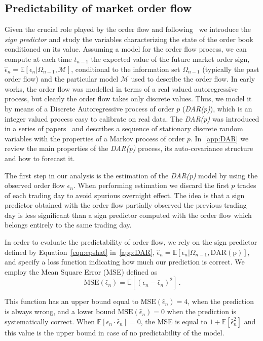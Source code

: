 \documentclass[12pt]{iopart}
\begin{document}
\subsection{Predictability of market order flow}
Given the crucial role played by the order flow and following~\cite{lillo2004long} we introduce the \textit{sign predictor} and study the variables characterizing the state of the order book conditioned on its value. Assuming a model for the order flow process, we can compute at each time $t_{n-1}$ the expected value of the future market order sign, $\hat{\epsilon}_n=\mathbb{E}[\epsilon_n|\Omega_{n-1},\mathcal{M}]$, conditional to the information set $\Omega_{n-1}$ (typically the past order flow) and the particular model $\mathcal{M}$ used to describe the order flow. In early works, the order flow was modelled in terms of a real valued autoregressive process, but clearly the order flow takes only discrete values. Thus, we model it by means of a Discrete Autoregressive process of order $p$ (\textit{DAR(p)}), which is an integer valued process easy to calibrate on real data. The \textit{DAR(p)} was introduced in a series of papers~\cite{jacobs1978discrete,jacobs1983stationary} and describes a sequence of stationary discrete random variables with the properties of a Markov process of order $p$. In~\ref{app:DAR} we review the main properties of the \textit{DAR(p)} process, its auto-covariance structure and how to forecast it. 

The first step in our analysis is the estimation of the \textit{DAR(p)} model by using the observed order flow $\epsilon_n$. When performing estimation we discard the first $p$ trades of each trading day to avoid spurious overnight effect. The idea is that a sign predictor obtained with the order flow partially observed the previous trading day is less significant than a sign predictor computed with the order flow which belongs entirely to the same trading day.

In order to evaluate the predictability of order flow, we rely on the sign predictor defined by Equation~\ref{eqn:epshat} in~\ref{app:DAR}, $\hat{\epsilon}_n=\mathbb{E}[\epsilon_n|\Omega_{n-1},\mathrm{DAR(p)}]$, and specify a loss function indicating how much our prediction is correct. We employ the Mean Square Error (MSE) defined as
\begin{equation}
  \mbox{MSE}(\hat{\epsilon}_n)=\mathbb{E}\left[(\epsilon_n-\hat{\epsilon}_n)^2\right]\,.
\end{equation}

This function has an upper bound equal to $\mbox{MSE}(\hat{\epsilon}_n)=4$, when the prediction is always wrong, and a lower bound $\mbox{MSE}(\hat{\epsilon}_n)=0$ when the prediction is systematically correct. When $\mathbb{E}[\epsilon_n\cdot\hat{\epsilon}_n]=0$, the MSE is equal to $1+\mathbb{E}[\hat{\epsilon}_n^2]$ and this value is the upper bound in case of no predictability of the model.
\end{document}

